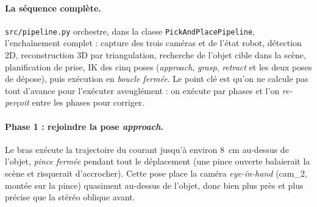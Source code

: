 \paragraph{La séquence complète.} \texttt{src/pipeline.py} orchestre, dans la
classe \texttt{PickAndPlacePipeline}, l'enchaînement complet : capture des trois
caméras et de l'état robot, détection 2D, reconstruction 3D par triangulation,
recherche de l'objet cible dans la scène, planification de prise, IK des cinq
poses (\textit{approach}, \textit{grasp}, \textit{retract} et les deux poses de
dépose), puis exécution en \emph{boucle fermée}. Le point clé est qu'on ne calcule
pas tout d'avance pour l'exécuter aveuglément : on exécute par phases et l'on
\emph{re-perçoit} entre les phases pour corriger.

\paragraph{Phase 1 : rejoindre la pose \textit{approach}.} Le bras exécute la
trajectoire du courant jusqu'à environ 8~cm au-dessus de l'objet, \emph{pince
fermée} pendant tout le déplacement (une pince ouverte balaierait la scène et
risquerait d'accrocher). Cette pose place la caméra \textit{eye-in-hand} (cam\_2,
montée sur la pince) quasiment au-dessus de l'objet, donc bien plus près et plus
précise que la stéréo oblique avant.

